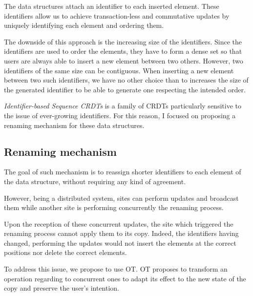 \documentclass[11pt]{article}
\begin{document}
The data structures attach an identifier to each inserted element.
These identifiers allow us to achieve transaction-less and commutative updates by uniquely identifying each element and ordering them.

The downside of this approach is the increasing size of the identifiers.
Since the identifiers are used to order the elements, they have to form a dense set so that users are always able to insert a new element between two others.
However, two identifiers of the same size can be contiguous.
When inserting a new element between two such identifiers, we have no other choice than to increases the size of the generated identifier to be able to generate one respecting the intended order.

\emph{Identifier-based Sequence \acp{CRDT}} is a family of \acp{CRDT} particularly sensitive to the issue of ever-growing identifiers.
For this reason, I focused on proposing a renaming mechanism for these data structures.

\subsection*{Renaming mechanism}

\hspace{1em} The goal of such mechanism is to reassign shorter identifiers to each element of the data structure,
without requiring any kind of agreement.

However, being a distributed system, sites can perform updates and broadcast them while another site is performing concurrently the renaming process.

Upon the reception of these concurrent updates, the site which triggered the renaming process cannot apply them to its copy.
Indeed, the identifiers having changed, performing the updates would not insert the elements at the correct positions nor delete the correct elements.

To address this issue, we propose to use \ac{OT}.
\ac{OT} proposes to transform an operation regarding to concurrent ones
to adapt its effect to the new state of the copy and preserve the user's intention.
\end{document}
